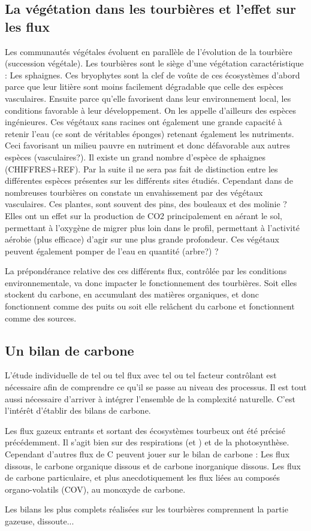 \subsection{La végétation dans les tourbières et l'effet sur les flux}
Les communautés végétales évoluent en parallèle de l'évolution de la tourbière (succession végétale).
Les tourbières sont le siège d'une végétation caractéristique : Les sphaignes.
Ces bryophytes sont la clef de voûte de ces écosystèmes d'abord parce que leur litière sont moins facilement dégradable que celle des espèces vasculaires.
Ensuite parce qu'elle favorisent dans leur environnement local, les conditions favorable à leur développement. 
On les appelle d'ailleurs des espèces ingénieures.
Ces végétaux sans racines ont également une grande capacité à retenir l'eau (ce sont de véritables éponges) retenant également les nutriments. 
Ceci favorisant un milieu pauvre en nutriment et donc défavorable aux autres espèces (vasculaires?).
Il existe un grand nombre d'espèce de sphaignes (CHIFFRES+REF).
Par la suite il ne sera pas fait de distinction entre les différentes espèces présentes sur les différents sites étudiés.
Cependant dans de nombreuses tourbières on constate un envahissement par des végétaux vasculaires.
Ces plantes, sont souvent des pins, des bouleaux et des molinie ?
Elles ont un effet sur la production de CO2 principalement en aérant le sol, permettant à l'oxygène de migrer plus loin dans le profil, permettant à l'activité aérobie (plus efficace) d'agir sur une plus grande profondeur.
Ces végétaux peuvent également pomper de l'eau en quantité (arbre?) ?


La prépondérance relative des ces différents flux, contrôlée par les conditions environnementale, va donc impacter le fonctionnement des tourbières. 
Soit elles stockent du carbone, en accumulant des matières organiques, et donc fonctionnent comme des puits ou soit elle relâchent du carbone et fonctionnent comme des sources.

\subsection{Un bilan de carbone}

L'étude individuelle de tel ou tel flux avec tel ou tel facteur contrôlant est nécessaire afin de comprendre ce qu'il se passe au niveau des processus. Il est tout aussi nécessaire d'arriver à intégrer l'ensemble de la complexité naturelle.
C'est l'intérêt d'établir des bilans de carbone.

Les flux gazeux entrants et sortant des écosystèmes tourbeux ont été précisé précédemment.
Il s'agit bien sur des respirations (\COO et \CHH) et de la photosynthèse.
Cependant d'autres flux de C peuvent jouer sur le bilan de carbone : 
Les flux dissous, le carbone organique dissous et de carbone inorganique dissous.
Les flux de carbone particulaire, et plus anecdotiquement les flux liées au composés organo-volatils (COV), au monoxyde de carbone.

Les bilans les plus complets réalisées sur les tourbières comprennent la partie gazeuse, dissoute...





